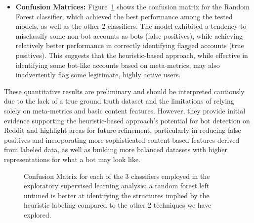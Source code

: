 \documentclass[
  12pt,
  letterpaper,
  DIV=11,
  numbers=noendperiod,
  abstract]{scrartcl}
\providecommand{\tightlist}{%
  \setlength{\itemsep}{0pt}\setlength{\parskip}{0pt}}\usepackage{longtable,booktabs,array}
\begin{document}
\begin{itemize}
\tightlist
\item
  \textbf{Confusion Matrices:} Figure~\ref{fig-confmat} shows the
  confusion matrix for the Random Forest classifier, which achieved the
  best performance among the tested models, as well as the other 2
  classifiers. The model exhibited a tendency to misclassify some
  non-bot accounts as bots (false positives), while achieving relatively
  better performance in correctly identifying flagged accounts (true
  positives). This suggests that the heuristic-based approach, while
  effective in identifying some bot-like accounts based on meta-metrics,
  may also inadvertently flag some legitimate, highly active users.
\end{itemize}

These quantitative results are preliminary and should be interpreted
cautiously due to the lack of a true ground truth dataset and the
limitations of relying solely on meta-metrics and basic content
features. However, they provide initial evidence supporting the
heuristic-based approach's potential for bot detection on Reddit and
highlight areas for future refinement, particularly in reducing false
positives and incorporating more sophisticated content-based features
derived from labeled data, as well as building more balanced datasets
with higher representations for what a bot may look like.

\begin{figure}


\caption{\label{fig-confmat}Confusion Matrix for each of the 3
classifiers employed in the exploratory supervised learning analysis: a
random forest left untuned is better at identifying the structures
implied by the heuristic labeling compared to the other 2 techniques we
have explored.}

\end{figure}%
\end{document}
